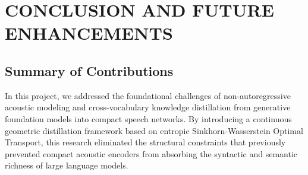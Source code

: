 \chapter{CONCLUSION AND FUTURE ENHANCEMENTS}
\label{ch:conclusion}

\section{Summary of Contributions}
In this project, we addressed the foundational challenges of non-autoregressive acoustic modeling and cross-vocabulary knowledge distillation from generative foundation models into compact speech networks. By introducing a continuous geometric distillation framework based on entropic Sinkhorn-Wasserstein Optimal Transport, this research eliminated the structural constraints that previously prevented compact acoustic encoders from absorbing the syntactic and semantic richness of large language models.

